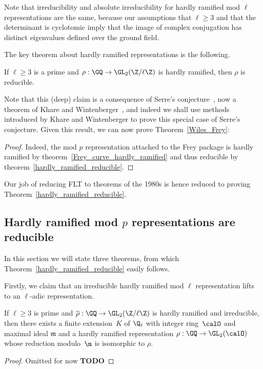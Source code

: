 Note that irreducibility and absolute irreducibility for hardly ramified mod $\ell$ representations
are the same, because our assumptions that $\ell\geq3$
and that the determinant is cyclotomic imply that the image of complex conjugation
has distinct eigenvalues defined over the ground field.

The key theorem about hardly ramified representations is the following.

\begin{theorem}
  \label{hardly_ramified_reducible}
  \leanok
  If $\ell\geq 3$ is a prime and $\rho:\GQ\to\GL_2(\Z/\ell\Z)$ is hardly ramified,
  then $\rho$ is reducible.
\end{theorem}

Note that this (deep) claim is a consequence of Serre's conjecture~\cite{serreconj},
now a theorem of Khare and Wintenberger~\cite{kwII}, and indeed we shall use
methods introduced by Khare and Wintenberger to prove this special case of
Serre's conjecture. Given this result, we can now prove Theorem~\ref{Wiles_Frey}:
\begin{proof}
  Indeed, the mod $p$ representation attached to the Frey package is hardly ramified by theorem~\ref{Frey_curve_hardly_ramified}
  and thus reducible by theorem~\ref{hardly_ramified_reducible}.
\end{proof}

Our job of reducing FLT to theorems of the 1980s is hence reduced to proving
Theorem~\ref{hardly_ramified_reducible}.

\subsection{Hardly ramified mod $p$ representations are reducible}

In this section we will state three theorems, from which Theorem~\ref{hardly_ramified_reducible}
easily follows.

Firstly, we claim that
an irreducible hardly ramified mod $\ell$ representation lifts to an $\ell$-adic representation.

\begin{theorem}
  \label{hardly_ramified_lifts}
  \leanok
  If $\ell\geq3$ is prime and $\overline{\rho}:\GQ\to\GL_2(\Z/\ell\Z)$
  is hardly ramified and irreducible, then there exists a finite extension~$K$ of $\Q_\ell$
  with integer ring~$\calO$ and maximal ideal $\mathfrak{m}$
  and a hardly ramified representation
  $\rho:\GQ\to\GL_2(\calO)$ whose reduction modulo~$\m$ is isomorphic to $\rho$.
\end{theorem}
\begin{proof}
  Omitted for now {\bf TODO}
\end{proof}

